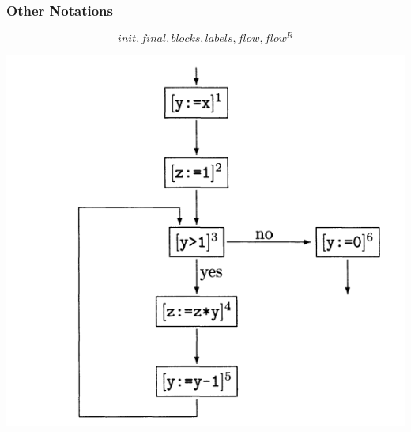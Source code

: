 \documentclass[aspectratio=1610, 13pt]{beamer}
\begin{document}
\begin{frame}\frametitle{Other Notations}

\[init,final,blocks,labels,flow,flow^{R}\]

\includegraphics[scale=0.3]{proc_flowgraph.png}
\end{frame}
\end{document}
